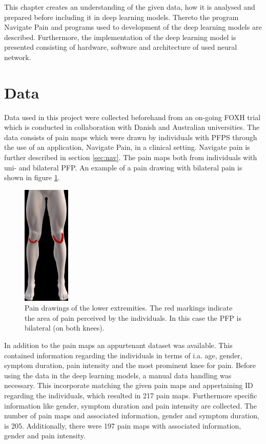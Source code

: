 This chapter creates an understanding of the given data, how it is analysed and prepared before including it in deep learning models. Thereto the program Navigate Pain and programs used to development of the deep learning models are described. Furthermore, the implementation of the deep learning model is presented consisting of hardware, software and architecture of used neural network.

\section{Data}
Data used in this project were collected beforehand from an on-going FOXH trial which is conducted in collaboration with Danish and Australian universities. The data consists of pain maps which were drawn by individuals with PFPS through the use of an application, Navigate Pain, in a clinical setting. Navigate pain is further described in section \ref{sec:nav}. The pain maps both from individuals with uni- and bilateral PFP. An example of a pain drawing with bilateral pain is shown in figure \ref{fig:kneepainmap}.

\begin{figure} [H]
\centering
\includegraphics[width=0.2\textwidth]{figures/kneepainmap}
\caption{Pain drawings of the lower extremities. The red markings indicate the area of pain perceived by the individuals. In this case the PFP is bilateral (on both knees).}
\label{fig:kneepainmap}
\end{figure}

\noindent
In addition to the pain maps an appurtenant dataset was available. This contained information regarding the individuals in terms of i.a. age, gender, symptom duration, pain intensity and the most prominent knee for pain.
Before using the data in the deep learning models, a manual data handling was necessary. This incorporate matching the given pain maps and appertaining ID regarding the individuals, which resulted in 217 pain maps. Furthermore specific information like gender, symptom duration and pain intensity are collected. The number of pain maps and associated information, gender and symptom duration, is 205. Additionally, there were 197 pain maps with associated information, gender and pain intensity.


